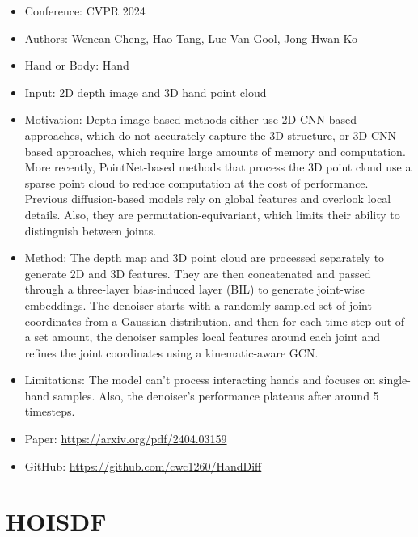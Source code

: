 \documentclass{article}
\begin{document}
\begin{itemize}
    \item Conference: CVPR 2024
    \item Authors: Wencan Cheng, Hao Tang, Luc Van Gool, Jong Hwan Ko
    \item Hand or Body: Hand
    \item Input: 2D depth image and 3D hand point cloud
    \item Motivation: Depth image-based methods either use 2D CNN-based approaches, which do not accurately capture the 3D structure, or 3D CNN-based approaches, which require large amounts of memory and computation. More recently, PointNet-based methods that process the 3D point cloud use a sparse point cloud to reduce computation at the cost of performance. Previous diffusion-based models rely on global features and overlook local details. Also, they are permutation-equivariant, which limits their ability to distinguish between joints.
    \item Method: The depth map and 3D point cloud are processed separately to generate 2D and 3D features. They are then concatenated and passed through a three-layer bias-induced layer (BIL) to generate joint-wise embeddings. The denoiser starts with a randomly sampled set of joint coordinates from a Gaussian distribution, and then for each time step out of a set amount, the denoiser samples local features around each joint and refines the joint coordinates using a kinematic-aware GCN.\@
    \item Limitations: The model can't process interacting hands and focuses on single-hand samples. Also, the denoiser's performance plateaus after around 5 timesteps.
    \item Paper: \url{https://arxiv.org/pdf/2404.03159}
    \item GitHub: \url{https://github.com/cwc1260/HandDiff}
\end{itemize}

\section*{HOISDF}
\end{document}
